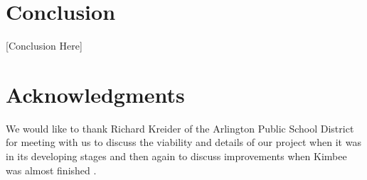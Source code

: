 \documentclass{sig-alternate-2013}
\begin{document}
\section{Conclusion}

[Conclusion Here]

\section{Acknowledgments}

We would like to thank Richard Kreider of the Arlington Public School District for meeting with us to discuss the viability and details of our project when it was in its developing stages and then again to discuss improvements when Kimbee was almost finished \cite{Kreider:Intro,Kreider:Results}.




\balancecolumns
\end{document}
